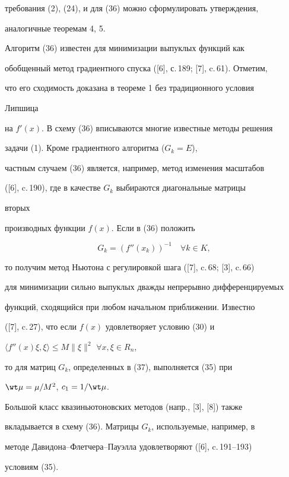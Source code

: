 требования (2), (24), и для (36) можно сформулировать утверждения,


аналогичные теоремам 4, 5.





Алгоритм (36) известен для минимизации выпуклых функций как 


обобщенный метод градиентного спуска ([6], с.\,189; [7], c.\,61). Отметим,


что его сходимость доказана в теореме 1 без традиционного условия 


Липшица


на $f'(x)$. В схему (36) вписываются многие известные методы решения


задачи (1). Кроме градиентного алгоритма ($G_k=E$),


частным случаем (36) является, например, метод изменения масштабов


([6], c.\,190), где в качестве $G_k$ выбираются диагональные матрицы 


вторых 


производных функции $f(x)$. Если в (36) положить


\begin{equation}


G_k=({f}''(x_k))^{-1}\quad \forall k\in K,


\end{equation}


то получим метод Ньютона с регулировкой шага ([7], c.\,68; [3], c.\,66)


для минимизации сильно выпуклых дважды непрерывно дифференцируемых 


функций, сходящийся при любом начальном приближении. Известно


([7], c.\,27), что если $f(x)$ удовлетворяет условию (30) и


$\langle f''(x)\xi,\xi\rangle \leq M\|\xi\|^2$ $\forall x,\xi \in R_n$,


то для матриц $G_k$, определенных в (37), выполняется (35) при


$\wt \mu =\mu /M^2$, $c_1=1/\wt \mu$.


Большой класс квазиньютоновских методов (напр., [3], [8]) также 


вкладывается в схему (36). Матрицы $G_k$, используемые, например, в 


методе Давидона--Флетчера--Пауэлла удовлетворяют ([6], c.\,191--193) 


условиям (35).






